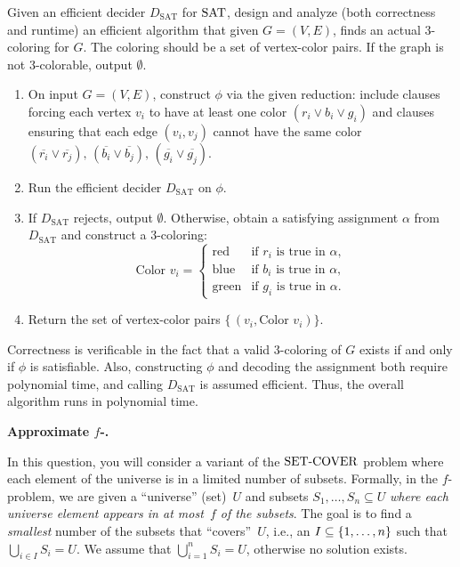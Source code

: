 \documentclass[11pt,addpoints,answers]{exam}
\begin{document}
\begin{questions}
    Given an efficient decider $D_\text{SAT}$ for $\text{SAT}$, design and analyze (both correctness and runtime) an efficient algorithm that given $G = (V,E)$, finds an actual 3-coloring for $G$. The coloring should be a set of vertex-color pairs. If the graph is not 3-colorable, output $\emptyset$. 
    \pagebreak
    \begin{solution}
    \begin{enumerate}
        \item On input \(G=(V,E)\), construct \(\phi\) via the given reduction: include clauses forcing each vertex \(v_i\) to have at least one color \((r_i \lor b_i \lor g_i)\) and clauses ensuring that each edge \((v_i,v_j)\) cannot have the same color \((\overline{r_i} \lor \overline{r_j}),\,(\overline{b_i}\lor \overline{b_j}),\,(\overline{g_i}\lor \overline{g_j})\).
        \item Run the efficient decider \(D_{\text{SAT}}\) on \(\phi\).
        \item If \(D_{\text{SAT}}\) rejects, output \(\emptyset\). Otherwise, obtain a satisfying assignment \(\alpha\) from \(D_{\text{SAT}}\) and construct a 3-coloring:
        \[
          \text{Color }v_i = 
          \begin{cases}
            \text{red}   & \text{if }r_i\text{ is true in }\alpha,\\
            \text{blue}  & \text{if }b_i\text{ is true in }\alpha,\\
            \text{green} & \text{if }g_i\text{ is true in }\alpha.
          \end{cases}
        \]
        \item Return the set of vertex-color pairs \(\{\, (v_i,\text{Color }v_i)\}\).
    \end{enumerate}
    Correctness is verificable in the fact that a valid 3-coloring of \(G\) exists if and only if \(\phi\) is satisfiable. Also, constructing \(\phi\) and decoding the assignment both require polynomial time, and calling \(D_{\text{SAT}}\) is assumed efficient. Thus, the overall algorithm runs in polynomial time.
    \end{solution}
      
        
  \pagebreak
  \question \textbf{Approximate $f$-\SC.}
  \nopagebreak

  In this question, you will consider a variant of the $\text{SET-COVER}$ problem where each element of the universe is in a limited number of subsets.
  Formally, in the $f$-\SC problem, we are given a ``universe'' (set)~$U$ and subsets $S_1, \ldots, S_n \subseteq U$ \emph{where each universe element appears in at most~$f$ of the subsets}.
  The goal is to find a \emph{smallest} number of the subsets that ``covers''~$U$, i.e., an $I \subseteq \{1,\ldots,n\}$ such that $\bigcup_{i \in I} S_{i} = U$.
  We assume that $\bigcup_{i=1}^{n} S_{i} = U$, otherwise no solution exists.


\end{questions}
\end{document}
